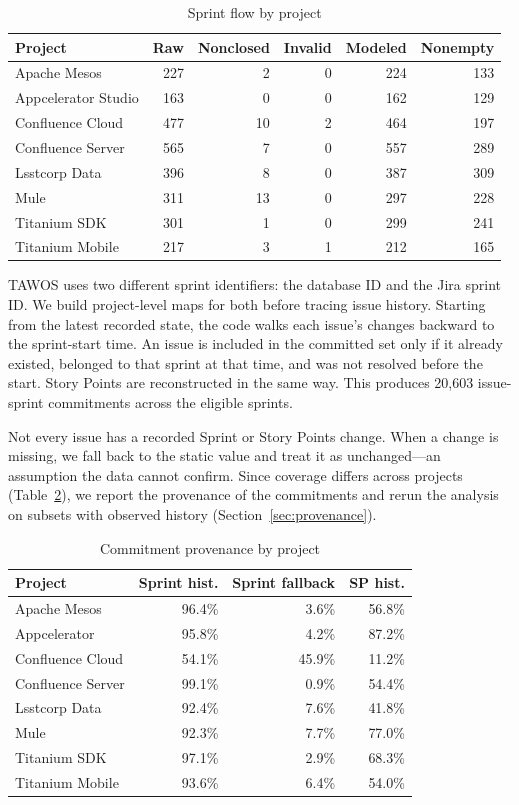 \documentclass[conference]{IEEEtran}
\begin{document}
\begin{table}[!htb]
\centering\scriptsize
\caption{Sprint flow by project}
\label{tab:flow}
\setlength{\tabcolsep}{2.1pt}
\begin{tabular}{@{}p{2.0cm}rrrrr@{}}
\toprule
Project & Raw & Nonclosed & Invalid & Modeled & Nonempty\\
\midrule
Apache Mesos & 227 & 2 & 0 & 224 & 133\\
Appcelerator Studio & 163 & 0 & 0 & 162 & 129\\
Confluence Cloud & 477 & 10 & 2 & 464 & 197\\
Confluence Server & 565 & 7 & 0 & 557 & 289\\
Lsstcorp Data & 396 & 8 & 0 & 387 & 309\\
Mule & 311 & 13 & 0 & 297 & 228\\
Titanium SDK & 301 & 1 & 0 & 299 & 241\\
Titanium Mobile & 217 & 3 & 1 & 212 & 165\\
\bottomrule
\end{tabular}
\end{table}

TAWOS uses two different sprint identifiers: the database ID and the Jira sprint ID.
We build project-level maps for both before tracing issue history.
Starting from the latest recorded state, the code walks each issue's changes backward to the sprint-start time.
An issue is included in the committed set only if it already existed, belonged to that sprint at that time, and was not resolved before the start.
Story Points are reconstructed in the same way.
This produces 20,603 issue-sprint commitments across the eligible sprints.

Not every issue has a recorded Sprint or Story Points change.
When a change is missing, we fall back to the static value and treat it as unchanged---an assumption the data cannot confirm.
Since coverage differs across projects (Table~\ref{tab:provproj}), we report the provenance of the commitments and rerun the analysis on subsets with observed history (Section~\ref{sec:provenance}).

\begin{table}[!htb]
\centering\scriptsize
\caption{Commitment provenance by project}
\label{tab:provproj}
\setlength{\tabcolsep}{2.2pt}
\begin{tabular}{@{}p{2.0cm}rrr@{}}
\toprule
Project & Sprint hist. & Sprint fallback & SP hist.\\
\midrule
Apache Mesos & 96.4\% & 3.6\% & 56.8\%\\
Appcelerator & 95.8\% & 4.2\% & 87.2\%\\
Confluence Cloud & 54.1\% & 45.9\% & 11.2\%\\
Confluence Server & 99.1\% & 0.9\% & 54.4\%\\
Lsstcorp Data & 92.4\% & 7.6\% & 41.8\%\\
Mule & 92.3\% & 7.7\% & 77.0\%\\
Titanium SDK & 97.1\% & 2.9\% & 68.3\%\\
Titanium Mobile & 93.6\% & 6.4\% & 54.0\%\\
\bottomrule
\end{tabular}
\end{table}
\end{document}
